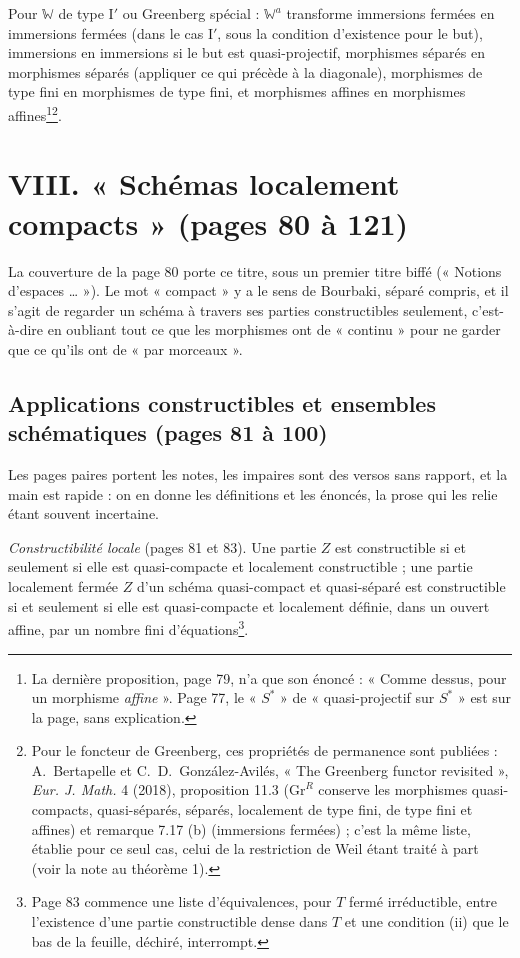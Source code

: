 \documentclass[11pt,a4paper]{article}
\begin{document}
Pour $\mathbb{W}$ de type I$'$ ou Greenberg spécial : $\mathbb{W}^{a}$ transforme
immersions fermées en immersions fermées (dans le cas I$'$, sous la condition
d'existence pour le but), immersions en immersions si le but est
quasi-projectif, morphismes séparés en morphismes séparés (appliquer ce qui
précède à la diagonale), morphismes de type fini en morphismes de type fini,
et morphismes affines en morphismes affines\footnote{La dernière proposition,
page 79, n'a que son énoncé : « Comme dessus, pour un morphisme
\emph{affine} ». Page 77, le « $S^{*}$ » de « quasi-projectif sur $S^{*}$ » est
sur la page, sans explication.}\footnote{Pour le foncteur de Greenberg, ces
propriétés de permanence sont publiées : A.~Bertapelle et
C.~D.~González-Avilés, « The Greenberg functor revisited », \emph{Eur. J.
Math.} 4 (2018), proposition 11.3 ($\mathrm{Gr}^R$ conserve les morphismes
quasi-compacts, quasi-séparés, séparés, localement de type fini, de type fini
et affines) et remarque 7.17 (b) (immersions fermées) ; c'est la même liste,
établie pour ce seul cas, celui de la restriction de Weil étant traité à part
(voir la note au théorème 1).}.

\section*{VIII. « Schémas localement compacts » (pages 80 à 121)}

La couverture de la page 80 porte ce titre, sous un premier titre biffé
(« Notions d'espaces \ldots{} »). Le mot « compact » y a le sens de Bourbaki,
séparé compris, et il s'agit de regarder un schéma à travers ses
parties constructibles seulement, c'est-à-dire en oubliant tout ce que les
morphismes ont de « continu » pour ne garder que ce qu'ils ont de « par
morceaux ».

\subsection*{Applications constructibles et ensembles schématiques (pages 81 à 100)}

Les pages paires portent les notes, les impaires sont des versos sans
rapport, et la main est rapide : on en donne les définitions et les énoncés,
la prose qui les relie étant souvent incertaine.

\emph{Constructibilité locale} (pages 81 et 83). Une partie $Z$ est constructible
si et seulement si elle est quasi-compacte et localement constructible ; une
partie localement fermée $Z$ d'un schéma quasi-compact et quasi-séparé est
constructible si et seulement si elle est quasi-compacte et localement définie,
dans un ouvert affine, par un nombre fini d'équations\footnote{Page 83 commence
une liste d'équivalences, pour $T$ fermé irréductible, entre l'existence d'une
partie constructible dense dans $T$ et une condition (ii) que le bas de la
feuille, déchiré, interrompt.}.
\end{document}
